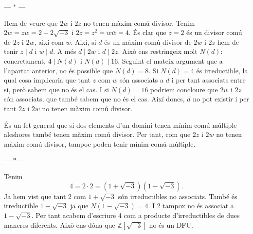 \documentclass[12pt]{article}
\newcommand{\Z}{\mathbb{Z}}
\newcommand{\R}{\Z[\sqrt{-3}]}
\newcommand{\parbreak}{
	\begin{center}
		--- $\ast$ ---
	\end{center} 
}
\begin{document}
\parbreak

Hem de veure que \( 2w \) i \( 2z \) no tenen màxim comú divisor. Tenim \( 2w = zw = 2 + 2\sqrt{-3} \) i \( 2z = z^2 = w\bar{w} = 4 \). És clar que \( z = 2 \) és un divisor comú de \( 2z \) i \( 2w \), així com \( w \). Així, si \( d \) és un màxim comú divisor de \( 2w \) i \( 2z \) hem de tenir \( z \mid d \) i \( w \mid d \). A més \( d \mid 2w \) i \( d \mid 2z \). Això ens restringeix molt \( N(d) \): concretament, \( 4 \mid N(d) \) i \( N(d) \mid 16 \). Seguint el mateix argument que a l'apartat anterior, no és possible que \( N(d) = 8 \). Si \( N(d) = 4 \) és irreductible, la qual cosa implicaria que tant \( z \) com \( w \) són associats a \( d \) i per tant associats entre si, però sabem que no és el cas. I si \( N(d) = 16 \) podriem concloure que \( 2w \) i \( 2z \) són associats, que també sabem que no és el cas. Així doncs, \( d \) no pot existir i per tant \( 2z \) i \( 2w \) no tenen màxim comú divisor.   

És un fet general que si dos elements d'un domini tenen mínim comú múltiple aleshores també tenen màxim comú divisor. Per tant, com que \( 2z \) i \( 2w \) no tenen màxim comú divisor, tampoc poden tenir mínim comú múltiple.  

\parbreak

Tenim 
\begin{equation*}
	4 = 2 \cdot 2 = (1 + \sqrt{-3})(1 - \sqrt{-3}).
\end{equation*}
Ja hem vist que tant \( 2 \) com \( 1 + \sqrt{-3} \) són irreductibles no associats. També és irreductible \( 1 - \sqrt{-3} \) ja que \( N(1 - \sqrt{-3}) = 4 \). I 2 tampox no és associat a \( 1 - \sqrt{-3} \). Per tant acabem d'escriure 4 com a producte d'irreductibles de dues maneres diferents. Això ens dóna que \( \R \) no és un DFU.    
\end{document}
